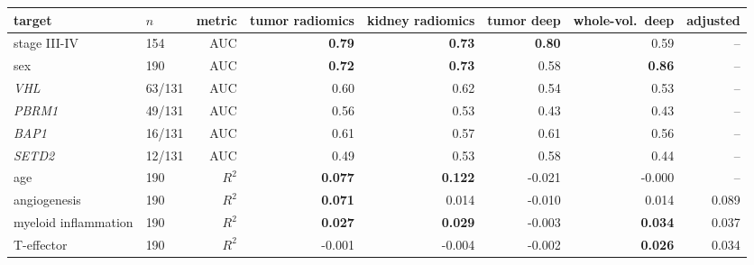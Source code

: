 \begin{tabular}{llrrrrrr}
\toprule
target & $n$ & metric & tumor radiomics & kidney radiomics & tumor deep & whole-vol.\ deep & adjusted\\
\midrule
stage III-IV & 154 & AUC & \textbf{0.79} & \textbf{0.73} & \textbf{0.80} & 0.59 & --\\
sex & 190 & AUC & \textbf{0.72} & \textbf{0.73} & 0.58 & \textbf{0.86} & --\\
\emph{VHL} & 63/131 & AUC & 0.60 & 0.62 & 0.54 & 0.53 & --\\
\emph{PBRM1} & 49/131 & AUC & 0.56 & 0.53 & 0.43 & 0.43 & --\\
\emph{BAP1} & 16/131 & AUC & 0.61 & 0.57 & 0.61 & 0.56 & --\\
\emph{SETD2} & 12/131 & AUC & 0.49 & 0.53 & 0.58 & 0.44 & --\\
age & 190 & $R^2$ & \textbf{0.077} & \textbf{0.122} & -0.021 & -0.000 & --\\
angiogenesis & 190 & $R^2$ & \textbf{0.071} & 0.014 & -0.010 & 0.014 & 0.089\\
myeloid inflammation & 190 & $R^2$ & \textbf{0.027} & \textbf{0.029} & -0.003 & \textbf{0.034} & 0.037\\
T-effector & 190 & $R^2$ & -0.001 & -0.004 & -0.002 & \textbf{0.026} & 0.034\\
\bottomrule
\end{tabular}

